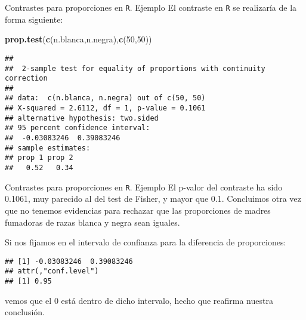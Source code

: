 \documentclass[
  ignorenonframetext,
]{beamer}
\newenvironment{Shaded}{\begin{snugshade}}{\end{snugshade}}
\newcommand{\DecValTok}[1]{\textcolor[rgb]{0.00,0.00,0.81}{#1}}
\newcommand{\KeywordTok}[1]{\textcolor[rgb]{0.13,0.29,0.53}{\textbf{#1}}}
\newcommand{\NormalTok}[1]{#1}
\newcommand{\OperatorTok}[1]{\textcolor[rgb]{0.81,0.36,0.00}{\textbf{#1}}}
\begin{document}
\begin{frame}[fragile]{Contrastes para proporciones en \texttt{R}.
Ejemplo}
\protect\hypertarget{contrastes-para-proporciones-en-r.-ejemplo-2}{}
El contraste en \texttt{R} se realizaría de la forma siguiente:

\begin{Shaded}
\begin{Highlighting}[]
\KeywordTok{prop.test}\NormalTok{(}\KeywordTok{c}\NormalTok{(n.blanca,n.negra),}\KeywordTok{c}\NormalTok{(}\DecValTok{50}\NormalTok{,}\DecValTok{50}\NormalTok{))}
\end{Highlighting}
\end{Shaded}

\begin{verbatim}
## 
##  2-sample test for equality of proportions with continuity correction
## 
## data:  c(n.blanca, n.negra) out of c(50, 50)
## X-squared = 2.6112, df = 1, p-value = 0.1061
## alternative hypothesis: two.sided
## 95 percent confidence interval:
##  -0.03083246  0.39083246
## sample estimates:
## prop 1 prop 2 
##   0.52   0.34
\end{verbatim}
\end{frame}

\begin{frame}[fragile]{Contrastes para proporciones en \texttt{R}.
Ejemplo}
\protect\hypertarget{contrastes-para-proporciones-en-r.-ejemplo-3}{}
El p-valor del contraste ha sido 0.1061, muy parecido al del test de
Fisher, y mayor que 0.1. Concluimos otra vez que no tenemos evidencias
para rechazar que las proporciones de madres fumadoras de razas blanca y
negra sean iguales.

Si nos fijamos en el intervalo de confianza para la diferencia de
proporciones:

\begin{Shaded}
\end{Shaded}

\begin{verbatim}
## [1] -0.03083246  0.39083246
## attr(,"conf.level")
## [1] 0.95
\end{verbatim}

vemos que el 0 está dentro de dicho intervalo, hecho que reafirma
nuestra conclusión.
\end{frame}
\end{document}
